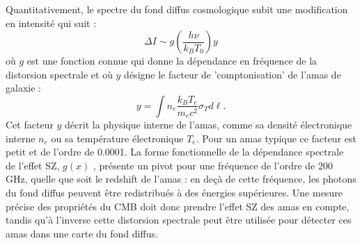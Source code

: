 Quantitativement, le spectre du fond diffus cosmologique subit une modification en intensité qui suit :
\begin{equation}
\Delta I \sim g(\frac{h\nu}{k_B T_0}) y
\end{equation}
où $g$ est une fonction connue qui donne la dépendance en fréquence de la distorsion spectrale et où $y$ désigne le facteur de 'comptonisation' de l'amas de galaxie :
\begin{equation}
y=\int n_e \frac{k_B T_e}{m_e c^2} \sigma_T d\ell.
\end{equation} 
Cet facteur $y$ décrit la physique interne de l'amas, comme sa densité électronique interne $n_e$ ou sa température électronique $T_e$. Pour un amas typique ce facteur est petit et de l'ordre de 0.0001. La forme fonctionnelle de la dépendance spectrale de l'effet SZ, $g(x)$ , présente un pivot pour une fréquence de l'ordre de 200 GHz, quelle que soit le redshift de l'amas : en deçà de cette fréquence, les photons du fond diffus peuvent être redistribués à des énergies supérieures. Une mesure précise des propriétés du CMB doit donc prendre l'effet SZ des amas en compte, tandis qu'à l'inverse cette distorsion spectrale peut être utilisée pour détecter ces amas dans une carte du fond diffus.
